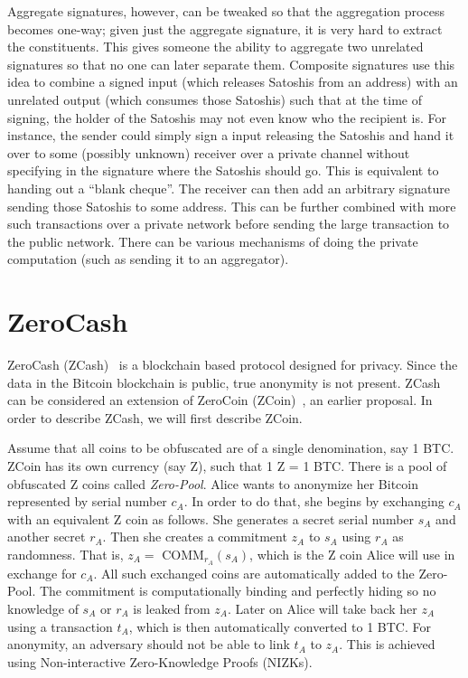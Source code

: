 \documentclass[]{report}   %
\begin{document}
Aggregate signatures, however, can be tweaked so that the aggregation process becomes one-way; given just the aggregate signature, it is very hard to extract the constituents. This gives someone the ability to aggregate two unrelated signatures so that no one can later separate them. Composite signatures use this idea to combine a signed input (which releases Satoshis from an address) with an unrelated output (which consumes those Satoshis) such that at the time of signing, the holder of the Satoshis may not even know who the recipient is. For instance, the sender could simply sign a input releasing the Satoshis and hand it over to some (possibly unknown) receiver over a private channel without specifying in the signature where the Satoshis should go. This is equivalent to handing out a ``blank cheque''. The receiver can then add an arbitrary signature sending those Satoshis to some address. This can be further combined with more such transactions over a private network before sending the large transaction to the public network. There can be various mechanisms of doing the private computation (such as sending it to an aggregator).


\section{ZeroCash}

ZeroCash (ZCash)~\cite{sasson2014zerocash} is a blockchain based protocol designed for privacy. Since the data in the Bitcoin blockchain is public, true anonymity is not present.
 ZCash can be considered an extension of ZeroCoin (ZCoin)~\cite{miers2013zerocoin}, an earlier proposal. In order to describe ZCash, we will first describe ZCoin.

Assume that all coins to be obfuscated are of a single denomination, say 1 BTC. ZCoin has its own currency (say Z), such that 1 Z = 1 BTC. There is a pool of obfuscated Z coins called {\em Zero-Pool}. Alice wants to anonymize her Bitcoin represented by serial number $c_A$. In order to do that, she begins by exchanging $c_A$ with an equivalent Z coin as follows. She generates a secret serial number $s_A$ and another secret $r_A$. Then she creates a commitment $z_A$ to $s_A$ using $r_A$ as randomness. That is, $z_A=$ COMM$_{r_A}(s_A)$, which is the Z coin Alice will use in exchange for $c_A$. All such exchanged coins are automatically added to the Zero-Pool. The commitment is computationally binding and perfectly hiding so no knowledge of $s_A$ or $r_A$ is leaked from $z_A$. Later on Alice will take back her $z_A$ using a transaction $t_A$, which is then automatically converted to 1 BTC. For anonymity, an adversary should not be able to link $t_A$ to $z_A$. This is achieved using Non-interactive Zero-Knowledge Proofs (NIZKs).
\end{document}
